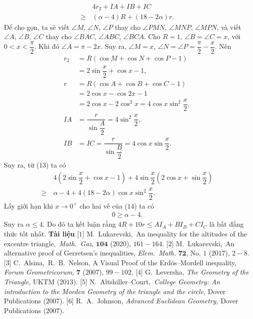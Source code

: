 \begin{multicols}{2}
	\begin{align*}
		&4r_2+IA+IB+IC\\[-0.5ex]
		\ge \,&(\alpha-4)R+(18-2\alpha)r.\tag{$13$}
	\end{align*}
	Để cho gọn, ta sẽ viết $\angle{M}$, $\angle{N}$, $\angle{P}$ thay cho $\angle{PMN}$, $\angle{MNP}$, $\angle{MPN}$, và viết $\angle{A}$, $\angle{B}$, $\angle{C}$ thay cho $\angle{BAC}$, $\angle{ABC}$, $\angle{BCA}$. Cho $R=1$, $\angle{B}=\angle{C}=x$, với $0<x<\dfrac{\pi}{2}$. Khi đó $\angle{A}=\pi-2x$. Suy ra, $\angle{M}=x$, $\angle{N}=\angle{P}=\dfrac{\pi}{2}-\dfrac{x}{2}$. Nên
	\begin{align*}r_2&=R(\cos{M}+\cos{N}+\cos{P}-1)\\[-0.5ex]
		&=2\sin{\dfrac{x}{2}}+\cos{x}-1,\\[-0.5ex]
		r&=R(\cos{A}+\cos{B}+\cos{C}-1)\\[-0.5ex]
		&=2\cos{x}-\cos{2x}-1\\[-0.5ex]
		&=2\cos{x}-2\cos^2{x}=4\cos{x}\sin^2{\dfrac{x}{2}},\\[-0.5ex]
		IA&=\dfrac{r}{\sin{\dfrac{A}{2}}}=4\sin^2{\dfrac{x}{2}},\\[-0.5ex]
		IB&=IC=\dfrac{r}{\sin{\dfrac{B}{2}}}=4\cos{x}\sin{\dfrac{x}{2}}.
	\end{align*}
	Suy ra, từ ($13$) ta có 
	\begin{align*}
		&4(2\sin\!{\dfrac{x}{2}}\!+\!\cos{x}\!-\!1\!\!)\!+\!4\sin\!{\dfrac{x}{2}}(2\cos{x}\!+\!\sin{\dfrac{x}{2}})\\[-0.5ex]
		\ge \,&\alpha-4+4(18-2\alpha)\cos{x}\sin^2{\dfrac{x}{2}}. \tag{$14$}
	\end{align*}
	Lấy giới hạn khi $x\rightarrow 0^{+}$ cho hai vế của ($14$) ta có
	\begin{align*}
		0 \ge \alpha-4.
	\end{align*}     
	Suy ra $\alpha \le 4$. Do đó ta kết luận rằng $4R+10r\le AI_A+BI_B+CI_C$ là bất đẳng thức tốt nhất.
	\vskip 0.05cm
	\textbf{\color{hoccungpi}Tài liệu}
	\vskip 0.05cm
	[$1$] M.~Lukarevski,~{An inequality for the altitudes of the excentre triangle,}~\textit{Math.~Gaz}, $\pmb{104}$ ($2020$), $161-164$.
	\vskip 0.05cm
	[$2$] M.~Lukarevski,~{An alternative proof of Gerretsen's inequalities,} \textit{Elem.~Math.} $\pmb{72}$, No. $1$ ($2017$), $2-8$.
	\vskip 0.05cm
	[$3$] C.~Alsina,~R.~B.~Nelson, A Visual Proof of the Erd\"{o}s--Mordell inequality, \textit{Forum Geometricorum,} $\pmb{7}$ ($2007$), $99-102$.
	\vskip 0.05cm
	[$4$] G.~Leversha, \textit{The Geometry of the Triangle}, UKTM ($2013$).
	\vskip 0.05cm
	[$5$] N.~Altshiller--Court,~\textit{College Geometry: An introduction to the Morden Geometry of the triangle and the circle,} Dover Publications ($2007$).
	\vskip 0.05cm
	[$6$] R.~A.~Johnson, \textit{Advanced Euclidean Geometry,} Dover Publications ($2007$).
\end{multicols}
